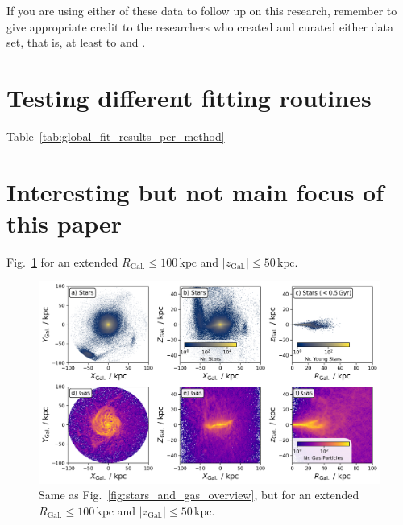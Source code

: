 \documentclass[fleqn,usenatbib]{mnras}
\begin{document}
If you are using either of these data to follow up on this research, remember to give appropriate credit to the researchers who created and curated either data set, that is, at least to \citet{Buder2021, Buder2022} and \citet{Buck2020b, Buck2021}.





\clearpage
\appendix

\section{Testing different fitting routines} \label{sec:appendix_different_fits}

Table~\ref{tab:global_fit_results_per_method}



\section{Interesting but not main focus of this paper}

Fig.~\ref{fig:stars_and_gas_overview_100kpc} for an extended $R_\mathrm{Gal.} \leq 100\,\mathrm{kpc}$ and $\vert z_\mathrm{Gal.} \vert \leq 50\,\mathrm{kpc}$.

\begin{figure}
    \centering
    \includegraphics[width=\textwidth]{figures/stars_and_gas_overview_100kpc.png}
    \caption{Same as Fig.~\ref{fig:stars_and_gas_overview}, but for an extended $R_\mathrm{Gal.} \leq 100\,\mathrm{kpc}$ and $\vert z_\mathrm{Gal.} \vert \leq 50\,\mathrm{kpc}$.}
    \label{fig:stars_and_gas_overview_100kpc}
\end{figure}
\end{document}

